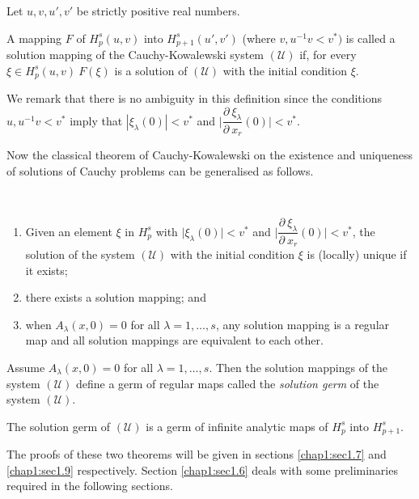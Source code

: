Let $u,  v,  u',  v'$ be strictly positive  real numbers.
\begin{defi*}%
  A mapping $F$ of $H^s_p(u, v)$ into $H^s_{p+1} (u',  v')$ (where $v,
  u^{-1} v < v^*)$ is called a solution mapping of the
  Cauchy-Kowalewski system $(\mathscr{U})$ if,  for every $\xi \in
  H^s_p (u,  v) ~ F(\xi)$ is a solution of $(\mathscr{U})$ with the
  initial condition $\xi$. 
\end{defi*}

We remark that there is no ambiguity in this definition since the
conditions $u,  u^{-1} v < v^*$ imply that $| \xi_\lambda (0) | <
v^*$ and $\Big| \dfrac{\partial ~ \xi_\lambda}{\partial ~x_r}(0) \Big|
< v^* $. 

Now the classical theorem of Cauchy-Kowalewski on the existence and
uniqueness of solutions of Cauchy problems can be generalised as
follows. 

\begin{theorem}\label{chap1:sec1.5:thm1}%
~

\begin{enumerate}[\rm (i)]
\item Given an element $\xi$ in $H^s_p$ with $\Big| \xi_\lambda (0)
  \Big| < v^*$ and $\Big| \dfrac{\partial ~\xi_\lambda}{\partial
    ~x_r}(0) \Big| < v^* $,  the solution of the system $(\mathscr{U})$
  with the initial condition $\xi$ is (locally) unique if it exists; 
\item there exists a solution mapping; and\pageoriginale 
\item when $A_\lambda (x, 0) = 0$ for all $\lambda = 1,  \ldots,  s$,
  any solution mapping is a regular map and all solution mappings are
  equivalent to each other. 
\end{enumerate}
\end{theorem}

Assume $A_\lambda (x,  0) = 0 $ for all $\lambda = 1,  \ldots,
s$. Then the solution mappings of the system $(\mathscr{U})$ define a
germ of regular maps called the \textit{solution germ} of the system
$(\mathscr{U})$. 

\begin{theorem}\label{chap1:sec1.5:thm2}%
  The solution germ of $(\mathscr{U})$ is a germ of infinite analytic
  maps of $H^s_p$ into $H^s_{p+1}$. 
\end{theorem}

The proofs of these two theorems will be given in
sections \ref{chap1:sec1.7} and \ref{chap1:sec1.9}
respectively. Section \ref{chap1:sec1.6} deals with some preliminaries
required in the following sections. 

